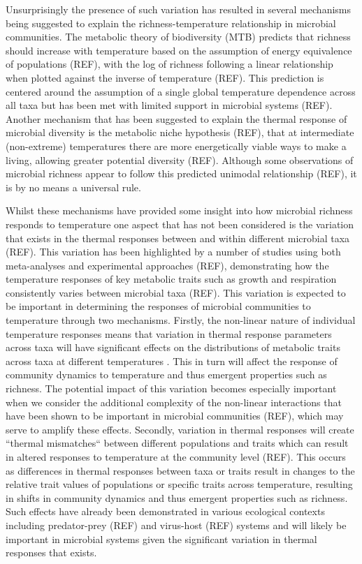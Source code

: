 \documentclass{article}
\begin{document}
Unsurprisingly the presence of such variation has resulted in several mechanisms being suggested to explain the richness-temperature relationship in microbial communities. The metabolic theory of biodiversity (MTB) predicts that richness should increase with temperature based on the assumption of energy equivalence of populations (REF), with the log of richness following a linear relationship when plotted against the inverse of temperature (REF). This prediction is centered around the assumption of a single global temperature dependence across all taxa but has been met with limited support in microbial systems (REF). Another mechanism that has been suggested to explain the thermal response of microbial diversity is the metabolic niche hypothesis (REF), that at intermediate (non-extreme) temperatures there are more energetically viable ways to make a living, allowing greater potential diversity (REF). Although some observations of microbial richness appear to follow this predicted unimodal relationship (REF), it is by no means a universal rule. 

Whilst these mechanisms have provided some insight into how microbial richness responds to temperature one aspect that has not been considered is the variation that exists in the thermal responses between and within different microbial taxa (REF). This variation has been highlighted by a number of studies using both meta-analyses and experimental approaches (REF), demonstrating how the temperature responses of key metabolic traits such as growth and respiration consistently varies between microbial taxa (REF). This variation is expected to be important in determining the responses of microbial communities to temperature through two mechanisms. Firstly, the non-linear nature of individual temperature responses means that variation in thermal response parameters across taxa will have significant effects on the distributions of metabolic traits across taxa at different temperatures \citep{Savage2004}. This in turn will affect the response of community dynamics  to temperature and thus emergent properties such as richness. The potential impact of this variation becomes especially important when we consider the additional complexity of the non-linear interactions that have been shown to be important in microbial communities (REF), which may serve to amplify these effects. Secondly, variation in thermal responses will create ``thermal mismatches`` between different populations and traits which can result in altered responses to temperature at the community level (REF). This occurs as differences in thermal responses between taxa or traits result in changes to the relative trait values of populations or specific traits across temperature, resulting in shifts in community dynamics and thus emergent properties such as richness. Such effects have already been demonstrated in various ecological contexts including predator-prey (REF) and virus-host (REF) systems and will likely be important in microbial systems given the significant variation in thermal responses that  exists. 
\end{document}
